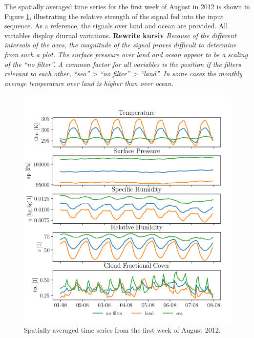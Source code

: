 The spatially averaged time series for the first week of August in 2012 is shown in Figure \ref{fig:first_week_august_2012}, illustrating the relative strength of the signal fed into the input sequence. As a reference, the signals over land and ocean are provided. All variables display diurnal variations. 
\textbf{Rewrite kursiv}
\textit{Because of the different intervals of the axes, the magnitude of the signal proves difficult to determine from such a plot. The surface pressure over land and ocean appear to be a scaling of the ``no filter''. A common factor for all variables is the position if the filters relevant to each other, ``sea'' > ``no filter'' > ``land''. In some cases the monthly average temperature over land is higher than over ocean.}
\begin{figure}[ht]
    \centering
    \includegraphics{python_figs/spatially_averaged_one_week_from_2012-08-01.png}
    \caption{Spatially averaged time series from the first week of August 2012.}
    \label{fig:first_week_august_2012}
\end{figure}


